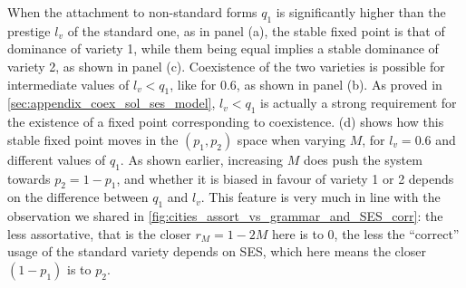 \documentclass[../thesis.tex]{subfiles}
\begin{document}
When the attachment to non-standard forms $q_1$ is significantly higher than the
prestige $l_v$ of the standard one, as in panel (a), the stable fixed point is that of
dominance of variety 1, while them being equal implies a stable dominance of variety 2,
as shown in panel (c). Coexistence of the two varieties is possible for intermediate
values of $l_v < q_1$, like for $0.6$, as shown in panel (b). As proved in
\cref{sec:appendix_coex_sol_ses_model}, $l_v < q_1$ is actually a strong requirement for
the existence of a fixed point corresponding to coexistence.
(d) shows how this stable fixed point moves in
the $(p_1, p_2)$ space when varying $M$, for $l_v = 0.6$ and different values of $q_1$.
As shown earlier, increasing $M$ does push the system towards $p_2 = 1 - p_1$, and
whether it is biased in favour of variety 1 or 2 depends on the difference between $q_1$
and $l_v$. This feature is very much in line with the observation we shared in
\cref{fig:cities_assort_vs_grammar_and_SES_corr}: the less assortative, that is the
closer $r_M = 1 - 2 M$ here is to $0$, the less the ``correct'' usage of the standard
variety depends on \ac{SES}, which here means the closer $(1 - p_1)$ is to $p_2$.
\end{document}
